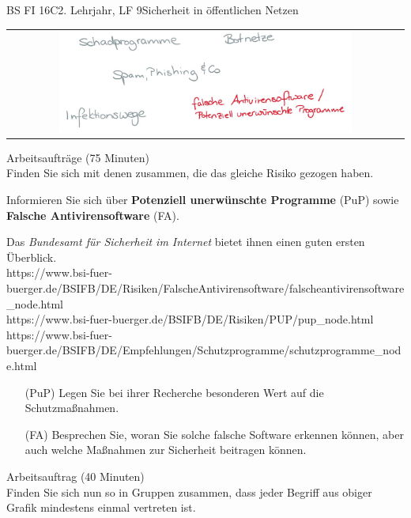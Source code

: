 \documentclass[oneside,openany,headings=optiontotoc,11pt,numbers=noenddot]{scrreprt}
\begin{document}
	\begin{worksheet}{BS FI 16C}{2. Lehrjahr, LF 9}{Sicherheit in öffentlichen Netzen}
		
		\begin{framed}
			\begin{tabular}{lcr}
				& \includegraphics[width=0.8\textwidth]{Bilder/AntivirUnwantedProg.jpg} & \\
			\end{tabular}
		\end{framed}
		\color{codegray}Arbeitsaufträge (75 Minuten)\\
		\color{black}
		Finden Sie sich mit denen zusammen, die das gleiche Risiko gezogen haben.
		\par
		\bigskip
		\noindent
		Informieren Sie sich über \textbf{Potenziell unerwünschte Programme} (PuP) sowie \textbf{Falsche Antivirensoftware} (FA).
		\par
		\bigskip
		\noindent
		Das \textit{Bundesamt für Sicherheit im Internet} bietet ihnen einen guten ersten Überblick.\\
		\small{\color{codegray}https://www.bsi-fuer-buerger.de/BSIFB/DE/Risiken/FalscheAntivirensoftware/falscheantivirensoftware\_node.html\\
		https://www.bsi-fuer-buerger.de/BSIFB/DE/Risiken/PUP/pup\_node.html\\
		https://www.bsi-fuer-buerger.de/BSIFB/DE/Empfehlungen/Schutzprogramme/schutzprogramme\_node.html}
		\normalsize
		\begin{itemize}
			\item[(PuP)] Legen Sie bei ihrer Recherche besonderen Wert auf die Schutzmaßnahmen.
			\item[(FA)] Besprechen Sie, woran Sie solche falsche Software erkennen können, aber auch welche Maßnahmen zur Sicherheit beitragen können.
		\end{itemize}
		\par
		\bigskip
		\noindent
		
		\color{codegray}Arbeitsauftrag (40 Minuten)\\
		\color{black}
		Finden Sie sich nun so in Gruppen zusammen, dass jeder Begriff aus obiger Grafik mindestens einmal vertreten ist.
		

\end{worksheet}
\end{document}

